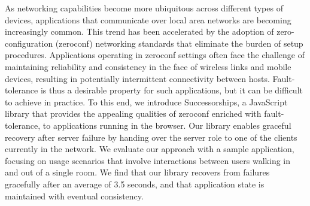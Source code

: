 As networking capabilities become more ubiquitous across different types of devices, applications that communicate over local area networks are becoming increasingly common.
This trend has been accelerated by the adoption of zero-configuration (zeroconf) networking standards that eliminate the burden of setup procedures.
Applications operating in zeroconf settings often face the challenge of maintaining reliability and consistency in the face of wireless links and mobile devices, resulting in potentially intermittent connectivity between hosts.
Fault-tolerance is thus a desirable property for such applications, but it can be difficult to achieve in practice.
To this end, we introduce Successorships, a JavaScript library that provides the appealing qualities of zeroconf enriched with fault-tolerance, to applications running in the browser.
Our library enables graceful recovery after server failure by handing over the server role to one of the clients currently in the network.
We evaluate our approach with a sample application, focusing on usage scenarios that involve interactions between users walking in and out of a single room. 
We find that our library recovers from failures gracefully after an average of 3.5 seconds, and that application state is maintained with eventual consistency.